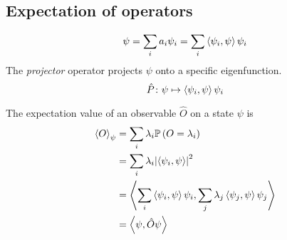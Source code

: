 \subsection{Expectation of operators}
\begin{definition}
	\[
		\psi = \sum_i a_i \psi_i = \sum_i \left\langle{\psi_i, \psi}\right\rangle \psi_i
	\]
	The \textit{projector} operator projects \( \psi \) onto a specific eigenfunction.
	\[
		\hat P \colon \psi \mapsto \left\langle{\psi_i, \psi}\right\rangle \psi_i
	\]
\end{definition}
\begin{definition}
	The expectation value of an observable \( \hat O \) on a state \( \psi \) is
	\begin{align*}
		\left\langle{O}\right\rangle_\psi & = \sum_i \lambda_i \mathbb{P}\left({O = \lambda_i}\right)                                                    \\
		               & = \sum_i \lambda_i \abs{\left\langle{\psi_i, \psi}\right\rangle}^2                                            \\
		               & = \left\langle{\sum_i \left\langle{\psi_i, \psi}\right\rangle \psi_i, \sum_j \lambda_j \left\langle{\psi_j, \psi}\right\rangle \psi_j}\right\rangle \\
		               & = \left\langle{\psi, \hat O \psi}\right\rangle
	\end{align*}
\end{definition}


